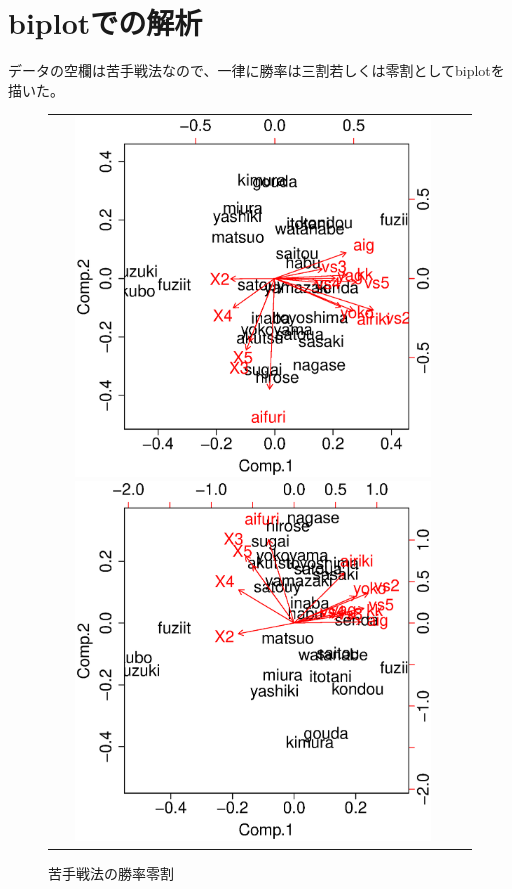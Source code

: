 \documentclass[11pt,a4paper,dvipdfmx]{jsarticle}
\begin{document}
\section{biplotでの解析}
データの空欄は苦手戦法なので、一律に勝率は三割若しくは零割としてbiplotを描いた。
\\
\begin{figure}[h]
    \begin{tabular}{cc}
        \begin{minipage}[t]{0.47\hsize}
            \centering
            \includegraphics[width=0.9\textwidth]{graph/shougi-biplot.eps}
            \caption{苦手戦法の勝率三割}
        \end{minipage}
        \begin{minipage}[t]{0.47\hsize}
            \centering
            \includegraphics[width=0.9\textwidth]{graph/shougi-biplot0.eps}
            \caption{苦手戦法の勝率零割}
        \end{minipage}
    \end{tabular}
\end{figure}
\end{document}
